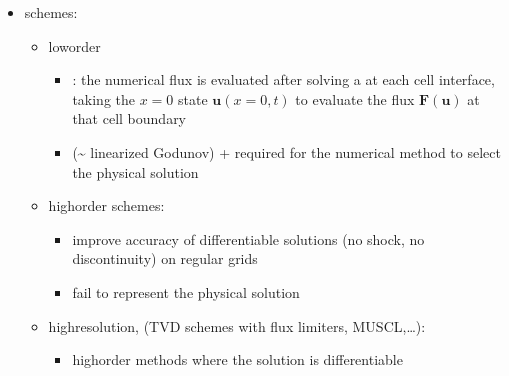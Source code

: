 \documentclass[letterpaper,10pt,english]{jupyterBook}
\begin{document}
\begin{itemize}
\begin{itemize}
\begin{itemize}
\item {} 
\sphinxAtStartPar
must satisfy , i.e. produce the physical solution (the limit of viscous problem for negligible viscosity) among the infinite possible solutions

\end{itemize}

\item {} 
\sphinxAtStartPar
schemes:
\begin{itemize}
\item {} 
\sphinxAtStartPar
low\sphinxhyphen{}order
\begin{itemize}
\item {} 
\sphinxAtStartPar
{\hyperref[\detokenize{ch/pde/fvm-hyperbolic-pde:pde-fvm-hyperbolic-flux-godunov}]{}}: the numerical flux is evaluated after solving a {\hyperref[\detokenize{ch/pde/hyperbolic-riemann-pb:pde-hyperbolic-riemann-pb}]{}} at each cell interface, taking the \(x = 0\) state \(\mathbf{u}(x=0, t)\) to evaluate the flux \(\mathbf{F}(\mathbf{u})\) at that cell boundary

\item {} 
\sphinxAtStartPar
{\hyperref[\detokenize{ch/pde/fvm-hyperbolic-pde:pde-fvm-hyperbolic-flux-roe}]{}} (\textasciitilde{} linearized Godunov) + {\hyperref[\detokenize{ch/pde/fvm-hyperbolic-pde:pde-fvm-hyperbolic-flux-entropy-fix}]{}} required for the numerical method to select the physical solution

\end{itemize}

\item {} 
\sphinxAtStartPar
high\sphinxhyphen{}order schemes:
\begin{itemize}
\item {} 
\sphinxAtStartPar
improve accuracy of differentiable solutions (no shock, no discontinuity) on regular grids

\item {} 
\sphinxAtStartPar
fail to represent the physical solution

\end{itemize}

\item {} 
\sphinxAtStartPar
high\sphinxhyphen{}resolution, (TVD schemes with flux limiters, MUSCL,…):
\begin{itemize}
\item {} 
\sphinxAtStartPar
high\sphinxhyphen{}order methods where the solution is differentiable


\end{itemize}
\end{itemize}
\end{itemize}
\end{itemize}
\end{document}
